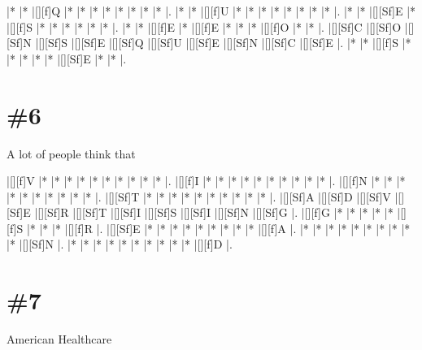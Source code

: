 \documentclass[letterpaper]{article}
\begin{document}
\vspace*{1em}
\begin{Puzzle}{11}{6}
|*        |*        |[][f]Q   |*        |*        |*        |*        |*        |*        |*        |*        |. 
|*        |*        |[][f]U   |*        |*        |*        |*        |*        |*        |*        |*        |.  
|*        |*        |[][Sf]E  |*        |[][f]S   |*        |*        |*        |*        |*        |*        |.
|*        |*        |[][f]E   |*        |[][f]E   |*        |*        |*        |[][f]O   |*        |*        |.  
|[][Sf]C  |[][Sf]O  |[][Sf]N  |[][Sf]S  |[][Sf]E  |[][Sf]Q  |[][Sf]U  |[][Sf]E  |[][Sf]N  |[][Sf]C  |[][Sf]E  |.
|*        |*        |[][f]S   |*        |*        |*        |*        |*        |[][Sf]E  |*        |*        |. 
\end{Puzzle}

\section*{\#6}
A lot of people think that

\vspace*{1em}
\begin{Puzzle}{11}{9}
|[][f]V   |*        |*        |*        |*        |*        |*        |*        |*        |*        |*        |. 
|[][f]I   |*        |*        |*        |*        |*        |*        |*        |*        |*        |*        |.  
|[][f]N   |*        |*        |*        |*        |*        |*        |*        |*        |*        |*        |.
|[][Sf]T  |*        |*        |*        |*        |*        |*        |*        |*        |*        |*        |.  
|[][Sf]A  |[][Sf]D  |[][Sf]V  |[][Sf]E  |[][Sf]R  |[][Sf]T  |[][Sf]I  |[][Sf]S  |[][Sf]I  |[][Sf]N  |[][Sf]G  |.
|[][f]G   |*        |*        |*        |*        |*        |[][f]S   |*        |*        |*        |[][f]R   |. 
|[][Sf]E  |*        |*        |*        |*        |*        |*        |*        |*        |*        |[][f]A   |.
|*        |*        |*        |*        |*        |*        |*        |*        |*        |*        |[][Sf]N  |.
|*        |*        |*        |*        |*        |*        |*        |*        |*        |*        |[][f]D   |.
\end{Puzzle}

\section*{\#7}
American Healthcare
\end{document}
